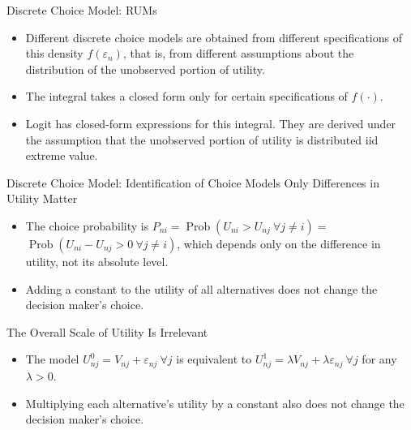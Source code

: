 \begin{frame}{Discrete Choice Model: RUMs}
\begin{itemize}
\item Different discrete choice models are obtained from different specifications of this density $f\left(\varepsilon_n\right)$, that is, from different assumptions about the distribution of the unobserved portion of utility.
\item The integral takes a closed form only for certain specifications of $f(\cdot)$.
\item Logit has closed-form expressions for this integral. They are derived under the assumption that the unobserved portion of utility is distributed iid extreme value.
\end{itemize}
\end{frame}




\begin{frame}{Discrete Choice Model: Identification of Choice Models}
Only Differences in Utility Matter
\begin{itemize}
\item The choice probability is $P_{n i}=\operatorname{Prob}\left(U_{n i}>U_{n j} \ \forall j \neq i\right)=$ $\operatorname{Prob}\left(U_{n i}-U_{n j}>0 \  \forall j \neq i\right)$, which depends only on the difference in utility, not its absolute level.
\item Adding a constant to the utility of all alternatives does not change the decision maker's choice.
\end{itemize}

\hspace*{\fill}

The Overall Scale of Utility Is Irrelevant
\begin{itemize}
\item The model $U_{n j}^0=V_{n j}+\varepsilon_{n j} \ \forall j$ is equivalent to $U_{n j}^1=\lambda V_{n j}+\lambda \varepsilon_{n j} \ \forall j$ for any $\lambda>0$.
\item Multiplying each alternative's utility by a constant also does not change the decision maker's choice.
\end{itemize}
\end{frame}



